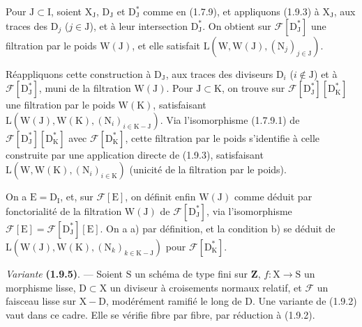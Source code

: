 \documentclass[11pt,leqno]{article}
\begin{document}
Pour \(\mathrm{J}\subset\mathrm{I}\), soient \(\mathrm{X}_{\mathrm{J}}\), \(\mathrm{D}_{\mathrm{J}}\) et \(\mathrm{D}_{\mathrm{J}}^*\) comme en (1.7.9), et appliquons (1.9.3) à \(\mathrm{X}_{\mathrm{J}}\), aux traces des \(\mathrm{D}_j\) (\(j\in\mathrm{J}\)), et à leur intersection \(\mathrm{D}_{\mathrm{J}}^*\). On obtient sur \(\mathscr{F}[\mathrm{D}_{\mathrm{J}}^*]\) une filtration par le poids \(\mathrm{W}(\mathrm{J})\), et elle satisfait \(\mathrm{L}(\mathrm{W},\mathrm{W}(\mathrm{J}),(\mathrm{N}_j)_{j\in\mathrm{J}})\).

Réappliquons cette construction à \(\mathrm{D}_{\mathrm{J}}\), aux traces des diviseurs \(\mathrm{D}_i\) (\(i\notin\mathrm{J}\)) et à \(\mathscr{F}[\mathrm{D}_{\mathrm{J}}^*]\), muni de la filtration \(\mathrm{W}(\mathrm{J})\). Pour \(\mathrm{J}\subset\mathrm{K}\), on trouve sur \(\mathscr{F}[\mathrm{D}_{\mathrm{J}}^*][\mathrm{D}_{\mathrm{K}}^*]\) une filtration par le poids \(\mathrm{W}(\mathrm{K})\), satisfaisant \(\mathrm{L}(\mathrm{W}(\mathrm{J}),\mathrm{W}(\mathrm{K}),(\mathrm{N}_i)_{i\in\mathrm{K}-\mathrm{J}})\). Via l’isomorphisme (1.7.9.1) de \(\mathscr{F}[\mathrm{D}_{\mathrm{J}}^*][\mathrm{D}_{\mathrm{K}}^*]\) avec \(\mathscr{F}[\mathrm{D}_{\mathrm{K}}^*]\), cette filtration par le poids s’identifie à celle construite par une application directe de (1.9.3), satisfaisant \(\mathrm{L}(\mathrm{W},\mathrm{W}(\mathrm{K}),(\mathrm{N}_i)_{i\in\mathrm{K}})\) (unicité de la filtration par le poids).

On a \(\mathrm{E}=\mathrm{D}_{\mathrm{I}}\), et, sur \(\mathscr{F}[\mathrm{E}]\), on définit enfin \(\mathrm{W}(\mathrm{J})\) comme déduit par fonctorialité de la filtration \(\mathrm{W}(\mathrm{J})\) de \(\mathscr{F}[\mathrm{D}_{\mathrm{J}}^*]\), via l’isomorphisme \(\mathscr{F}[\mathrm{E}]=\mathscr{F}[\mathrm{D}_{\mathrm{J}}^*][\mathrm{E}]\). On a a) par définition, et la condition b) se déduit de \(\mathrm{L}(\mathrm{W}(\mathrm{J}),\mathrm{W}(\mathrm{K}),(\mathrm{N}_k)_{k\in\mathrm{K}-\mathrm{J}})\) pour \(\mathscr{F}[\mathrm{D}_{\mathrm{K}}^*]\).

\textit{Variante} \textbf{(1.9.5)}. — Soient \(\mathrm{S}\) un schéma de type fini sur \(\mathbf{Z}\), \(f:\mathrm{X}\to\mathrm{S}\) un morphisme lisse, \(\mathrm{D}\subset\mathrm{X}\) un diviseur à croisements normaux relatif, et \(\mathscr{F}\) un faisceau lisse sur \(\mathrm{X}-\mathrm{D}\), modérément ramifié le long de \(\mathrm{D}\). Une variante de (1.9.2) vaut dans ce cadre. Elle se vérifie fibre par fibre, par réduction à (1.9.2).
\end{document}
